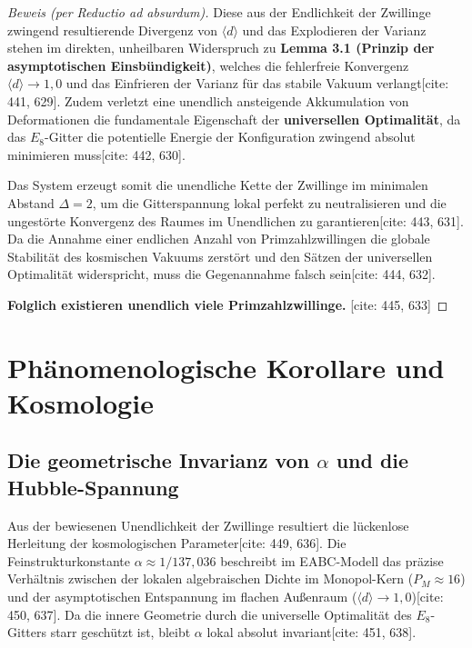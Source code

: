 \documentclass[11pt,a4paper]{article}
\newcommand{\Eoct}{E_8}
\theoremstyle{definition}
\begin{document}
\begin{proof}[Beweis (per Reductio ad absurdum)]
		Diese aus der Endlichkeit der Zwillinge zwingend resultierende Divergenz von $\langle d \rangle$ und das Explodieren der Varianz stehen im direkten, unheilbaren Widerspruch zu \textbf{Lemma 3.1 (Prinzip der asymptotischen Einsbündigkeit)}, welches die fehlerfreie Konvergenz $\langle d \rangle \rightarrow 1{,}0$ und das Einfrieren der Varianz für das stabile Vakuum verlangt[cite: 441, 629]. Zudem verletzt eine unendlich ansteigende Akkumulation von Deformationen die fundamentale Eigenschaft der \textbf{universellen Optimalität}, da das $\Eoct$-Gitter die potentielle Energie der Konfiguration zwingend absolut minimieren muss[cite: 442, 630].
		
		Das System erzeugt somit die unendliche Kette der Zwillinge im minimalen Abstand $\Delta = 2$, um die Gitterspannung lokal perfekt zu neutralisieren und die ungestörte Konvergenz des Raumes im Unendlichen zu garantieren[cite: 443, 631]. Da die Annahme einer endlichen Anzahl von Primzahlzwillingen die globale Stabilität des kosmischen Vakuums zerstört und den Sätzen der universellen Optimalität widerspricht, muss die Gegenannahme falsch sein[cite: 444, 632].
		
		\textbf{Folglich existieren unendlich viele Primzahlzwillinge.} [cite: 445, 633]
	\end{proof}
	
	\section{Phänomenologische Korollare und Kosmologie}
	
	\subsection{Die geometrische Invarianz von $\alpha$ und die Hubble-Spannung}
	Aus der bewiesenen Unendlichkeit der Zwillinge resultiert die lückenlose Herleitung der kosmologischen Parameter[cite: 449, 636]. Die Feinstrukturkonstante $\alpha \approx 1/137{,}036$ beschreibt im EABC-Modell das präzise Verhältnis zwischen der lokalen algebraischen Dichte im Monopol-Kern ($P_M \approx 16$) und der asymptotischen Entspannung im flachen Außenraum ($\langle d \rangle \rightarrow 1{,}0$)[cite: 450, 637]. Da die innere Geometrie durch die universelle Optimalität des $\Eoct$-Gitters starr geschützt ist, bleibt $\alpha$ lokal absolut invariant[cite: 451, 638].
	
\end{document}

